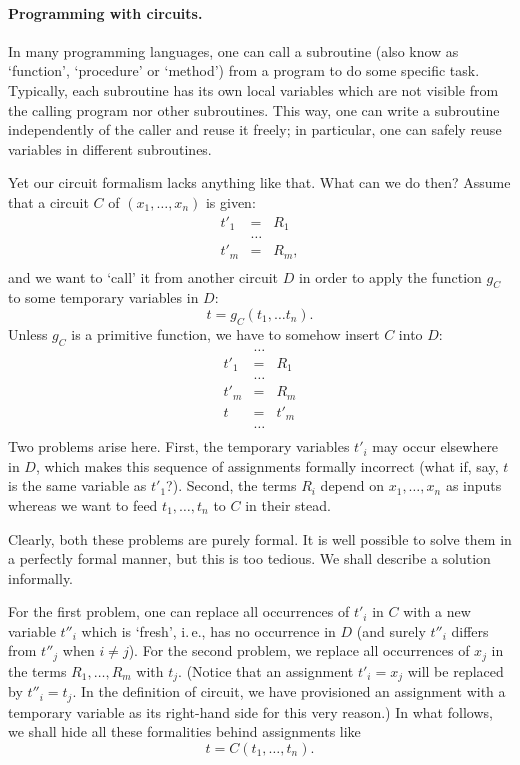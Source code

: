 \documentclass[12pt,notitlepage]{article}
\theoremstyle{plain}
\theoremstyle{definition}
\theoremstyle{plain}
\newcommand{\1}{\mathbf{1}}
\newcommand{\0}{\mathbf{0}}
\begin{document}
\paragraph{Programming with circuits.} In many programming languages, one can call a subroutine (also know as `function', `procedure' or `method') from a program to do some specific task. Typically, each subroutine has its own local variables which are not visible from the calling program nor other subroutines. This way, one can write a subroutine independently of the caller and reuse it freely; in particular, one can safely reuse variables in different subroutines.

Yet our circuit formalism lacks anything like that. What can we do then? Assume that a circuit $C$ of $(x_1, \ldots, x_n)$ is given:
$$
\begin{array}{rcl}
	t'_1 &=& R_1\\
	&\ldots&\\
	t'_m &=& R_m,\\
\end{array}
$$
and we want to `call' it from another circuit $D$ in order to apply the function $g_C$ to some temporary variables in $D$:
$$t = g_C(t_1, \ldots t_n).$$
Unless $g_C$ is a primitive function, we have to somehow insert $C$ into $D$:
$$
\begin{array}{rcl}
	&\ldots&\\
	t'_1 &=& R_1\\
	&\ldots&\\
	t'_m &=& R_m\\
	t &=& t'_m\\
	&\ldots&\\
\end{array}
$$
Two problems arise here. First, the temporary variables $t'_i$ may occur elsewhere in $D$, which makes this sequence of assignments formally incorrect (what if, say, $t$ is the same variable as $t'_1$?). Second, the terms $R_i$ depend on $x_1, \ldots, x_n$ as inputs whereas we want to feed $t_1, \ldots, t_n$ to $C$ in their stead.

Clearly, both these problems are purely formal. It is well possible to solve them in a perfectly formal manner, but this is too tedious. We shall describe a solution informally.

For the first problem, one can replace all occurrences of $t'_i$ in $C$ with a new variable $t''_i$ which is `fresh', i.\,e., has no occurrence in $D$ (and surely $t''_i$ differs from $t''_j$ when $i \neq j$). For the second problem, we replace all occurrences of $x_j$ in the terms $R_1, \ldots, R_m$ with $t_j$. (Notice that an assignment $t'_i = x_j$ will be replaced by $t''_i = t_j$. In the definition of circuit, we have provisioned an assignment with a temporary variable as its right-hand side for this very reason.) In what follows, we shall hide all these formalities behind assignments like
$$t = C(t_1, \ldots, t_n).$$
\end{document}
